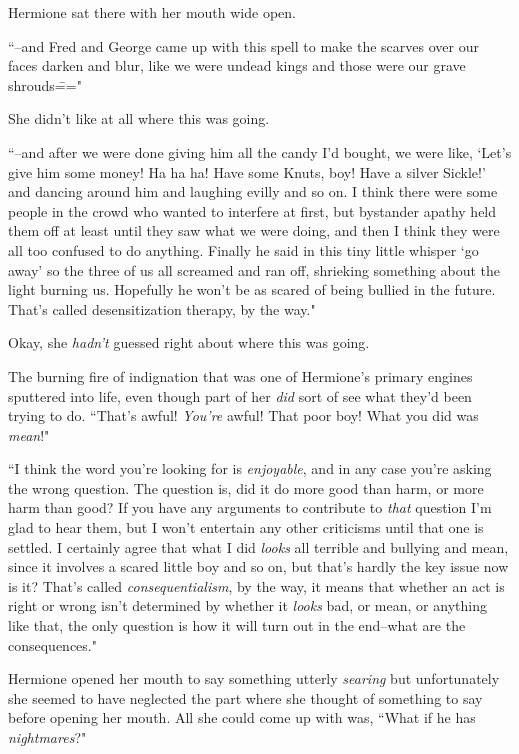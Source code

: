 Hermione sat there with her mouth wide open.

``\---and Fred and George came up with this spell to make the scarves over our faces darken and blur, like we were undead kings and those were our grave shrouds\==="

She didn't like at all where this was going.

``\---and after we were done giving him all the candy I'd bought, we were like, `Let's give him some money! Ha ha ha! Have some Knuts, boy! Have a silver Sickle!' and dancing around him and laughing evilly and so on. I think there were some people in the crowd who wanted to interfere at first, but bystander apathy held them off at least until they saw what we were doing, and then I think they were all too confused to do anything. Finally he said in this tiny little whisper `go away' so the three of us all screamed and ran off, shrieking something about the light burning us. Hopefully he won't be as scared of being bullied in the future. That's called desensitization therapy, by the way."

Okay, she \emph{hadn't} guessed right about where this was going.

The burning fire of indignation that was one of Hermione's primary engines sputtered into life, even though part of her \emph{did} sort of see what they'd been trying to do. ``That's awful! \emph{You're} awful! That poor boy! What you did was \emph{mean}!"

``I think the word you're looking for is \emph{enjoyable}, and in any case you're asking the wrong question. The question is, did it do more good than harm, or more harm than good? If you have any arguments to contribute to \emph{that} question I'm glad to hear them, but I won't entertain any other criticisms until that one is settled. I certainly agree that what I did \emph{looks} all terrible and bullying and mean, since it involves a scared little boy and so on, but that's hardly the key issue now is it? That's called \emph{consequentialism}, by the way, it means that whether an act is right or wrong isn't determined by whether it \emph{looks} bad, or mean, or anything like that, the only question is how it will turn out in the end\---what are the consequences."

Hermione opened her mouth to say something utterly \emph{searing} but unfortunately she seemed to have neglected the part where she thought of something to say before opening her mouth. All she could come up with was, ``What if he has \emph{nightmares}?"

